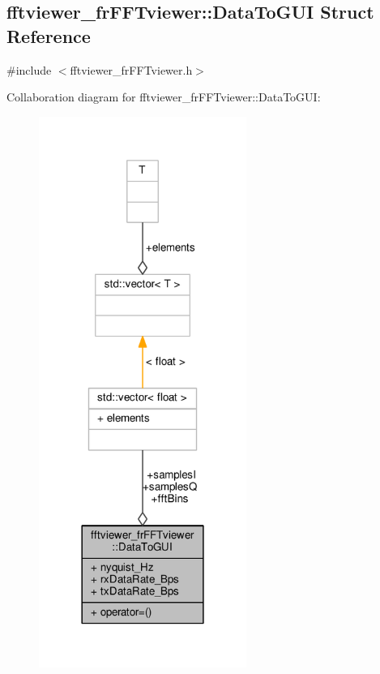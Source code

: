 \subsection{fftviewer\+\_\+fr\+F\+F\+Tviewer\+:\+:Data\+To\+G\+UI Struct Reference}
\label{structfftviewer__frFFTviewer_1_1DataToGUI}


{\ttfamily \#include $<$fftviewer\+\_\+fr\+F\+F\+Tviewer.\+h$>$}



Collaboration diagram for fftviewer\+\_\+fr\+F\+F\+Tviewer\+:\+:Data\+To\+G\+UI\+:
\nopagebreak
\begin{figure}[H]
\begin{center}
\leavevmode
\includegraphics[width=192pt]{df/d42/structfftviewer__frFFTviewer_1_1DataToGUI__coll__graph}
\end{center}
\end{figure}
